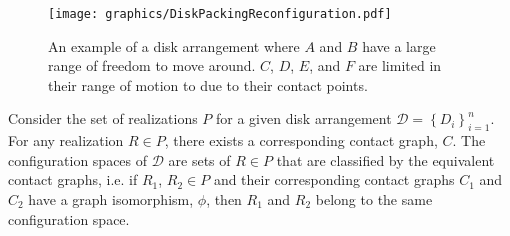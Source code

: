 \documentclass[10pt]{CSUNthesis}
\theoremstyle{plain}%
\theoremstyle{definition}
\theoremstyle{remark}
\newcommand{\DD}{{\mathcal{D}}} %
\begin{document}
\begin{figure}[!htbp]
\begin{center}
\texttt{[image: graphics/DiskPackingReconfiguration.pdf]}
\end{center} 
\caption{An example of a disk arrangement where $A$ and $B$ have a large range of freedom to move around.  $C$, $D$, $E$, and $F$ are limited in their range of motion to due to their contact points.}
\label{fig:configuration-5}
\end{figure}

Consider the set of realizations $P$ for a given disk arrangement $\DD = \left\lbrace D_i \right\rbrace_{i=1}^n$.  For any realization $R \in P$, there exists a corresponding contact graph, $C$.  The configuration spaces of $\DD$ are sets of $R \in P$ that are classified by the equivalent contact graphs, i.e. if $R_1$, $R_2 \in P$ and their corresponding contact graphs $C_1$ and $C_2$ have a graph isomorphism, $\phi$, then $R_1$ and $R_2$ belong to the same configuration space.








\end{document}
